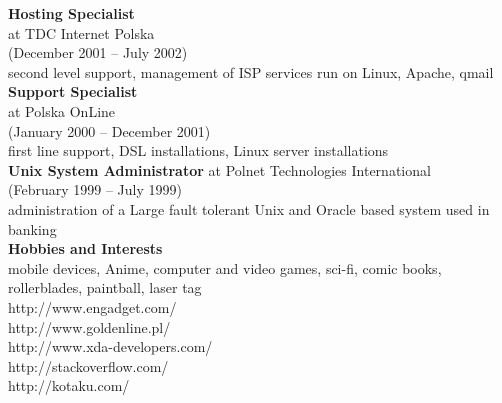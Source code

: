 \documentclass[9pt,a4paper,twocolumn]{extarticle}
\begin{document}
{\bf Hosting Specialist }\\
at TDC Internet Polska \\
(December 2001 – July 2002) \\
second level support, management of ISP services run on Linux, Apache, qmail \\

{\bf Support Specialist }\\
at Polska OnLine \\
(January 2000 – December 2001) \\
ﬁrst line support, DSL installations, Linux server installations\\

{\bf Unix System Administrator }
at Polnet Technologies International \\
(February 1999 – July 1999) \\
administration of a Large fault tolerant Unix and Oracle based system used in banking \\

{\bf\Large Hobbies and Interests}\\

mobile devices, Anime, computer and video games, sci-fi, comic books, rollerblades, paintball, laser tag\\

http://www.engadget.com/\\
http://www.goldenline.pl/\\
http://www.xda-developers.com/\\
http://stackoverflow.com/\\
http://kotaku.com/\\
\end{document}
